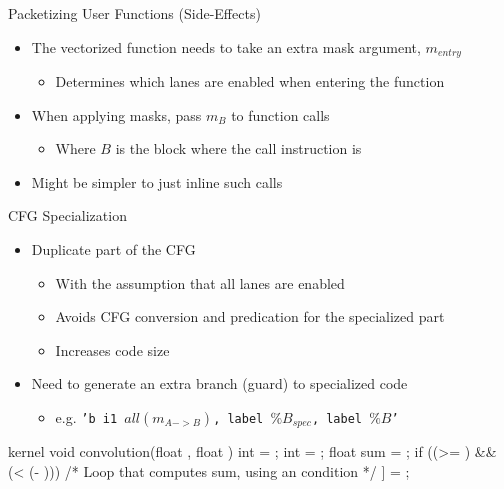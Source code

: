 
\begin{frame}{Packetizing User Functions (Side-Effects)}

\begin{itemize}
    \item The vectorized function needs to take an extra mask argument, $m_{entry}$
    \begin{itemize}
        \item Determines which lanes are enabled when entering the function
    \end{itemize}
    \item When applying masks, pass $m_{B}$ to function calls
    \begin{itemize}
        \item Where $B$ is the block where the call instruction is
    \end{itemize}
    \item Might be simpler to just inline such calls
\end{itemize}

\end{frame}


\begin{frame}[fragile]{CFG Specialization}

\begin{itemize}
    \item Duplicate part of the CFG
    \begin{itemize}
        \item With the assumption that all lanes are enabled
        \item Avoids CFG conversion and predication for the specialized part
        \item Increases code size
    \end{itemize}
    \item Need to generate an extra branch (guard) to specialized code
    \begin{itemize}
        \item e.g. \texttt{'b i1 $all(m_{A->B})$, label $\%B_{spec}$, label $\%B$'}
    \end{itemize}
\end{itemize}

\begin{codebox}[commandchars=\\\[\]]
kernel void convolution(float \uniform[*src], float \uniform[*dst]) {
  int \varying[x] = ;
  int \uniform[width] = ;
  float sum = \uniform[0.0f];
  if ((\varying[x] >= ) && (\varying[x] < (\uniform[width] - ))) {
    /* Loop that computes sum, using an \uniform[uniform] condition */
  }
  \uniform[dst]\idx[\varying[x]] = \varying[sum];
}
\end{codebox}

\end{frame}

